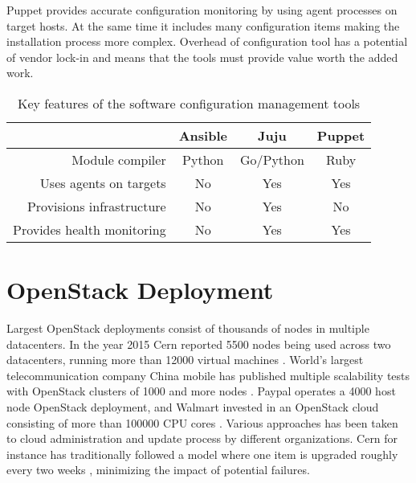 Puppet provides accurate configuration monitoring by using agent processes on
target hosts. At the same time it includes many configuration items making the
installation process more complex. Overhead of configuration tool has a
potential of vendor lock-in and means that the tools must provide value worth
the added work.

\begin{table}
\centering

\begin{tabular} {r|c c c}
                            & Ansible & Juju      & Puppet \\
\hline
Module compiler             & Python  & Go/Python & Ruby   \\
Uses agents on targets      & No      & Yes       & Yes    \\
Provisions infrastructure   & No      & Yes       & No     \\
Provides health monitoring  & No      & Yes       & Yes    \\
\end{tabular}

\caption{Key features of the software configuration management tools}
\end{table}

\chapter{OpenStack Deployment}\label{deployment}

Largest OpenStack deployments consist of thousands of nodes in multiple
datacenters. In the year 2015 Cern reported 5500 nodes being used across two
datacenters, running more than 12000 virtual machines \cite{bell2015scaling}.
World's largest telecommunication company China mobile has published multiple
scalability tests with OpenStack clusters of 1000 and more nodes
\cite{china-mobile}. Paypal operates a 4000 host node OpenStack deployment, and
Walmart invested in an OpenStack cloud consisting of more than 100000 CPU cores
\cite{kanso2017enhancing}. Various approaches has been taken to cloud
administration and update process by different organizations. Cern for instance
has traditionally followed a model where one item is upgraded roughly every two
weeks \cite{bell2015scaling}, minimizing the impact of potential failures.

